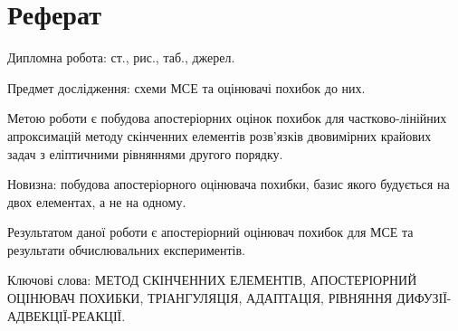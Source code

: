 
\section*{Реферат}

Дипломна робота: \pageref{LastPage} ст.,  рис.,  таб.,  джерел.

Предмет дослідження: схеми МСЕ та оцінювачі похибок до них.

Метою роботи є побудова апостеріорних оцінок похибок для частково-лінійних апроксимацій методу скінченних елементів розв'язків двовимірних крайових задач з еліптичними рівняннями другого порядку.

Новизна: побудова апостеріорного оцінювача похибки, базис якого будується на двох елементах, а не на одному.

Результатом даної роботи є апостеріорний оцінювач похибок для МСЕ та результати обчислювальних експериментів.

Ключові слова: \MakeTextUppercase{метод скінченних елементів, апостеріорний оцінювач похибки, тріангуляція, адаптація, рівняння дифузії-адвекції-реакції}.


